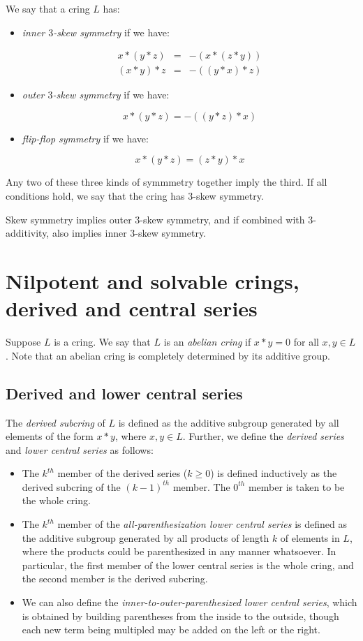 \documentclass[10pt]{amsart}
\begin{document}
We say that a cring $L$ has:

\begin{itemize}
\item {\em inner $3$-skew symmetry} if we have:

  \begin{eqnarray*}
    x * (y * z) & = & -(x * (z * y))\\
    (x * y) * z & = & - ((y * x) * z)
  \end{eqnarray*}
\item {\em outer $3$-skew symmetry} if we have:
  
  $$x * (y * z) = -((y * z) * x)$$
\item {\em flip-flop symmetry} if we have:

  $$x * (y * z) = (z * y) * x$$
\end{itemize}

Any two of these three kinds of symmmetry together imply the third. If
all conditions hold, we say that the cring has {$3$-skew symmetry}.

Skew symmetry implies outer $3$-skew symmetry, and if combined with
$3$-additivity, also implies inner $3$-skew symmetry.

\section{Nilpotent and solvable crings, derived and central series}

Suppose $L$ is a cring. We say that $L$ is an {\em abelian cring} if
$x * y = 0$ for all $x,y \in L$. Note that an abelian cring is
completely determined by its additive group.

\subsection{Derived and lower central series}

The {\em derived subcring} of $L$ is defined as the additive subgroup
generated by all elements of the form $x * y$, where $x,y \in
L$. Further, we define the {\em derived series} and {\em lower central
series} as follows:

\begin{itemize}
\item The $k^{th}$ member of the derived series ($k \ge 0$) is defined
  inductively as the derived subcring of the $(k - 1)^{th}$
  member. The $0^{th}$ member is taken to be the whole cring.
\item The $k^{th}$ member of the {\em all-parenthesization lower
  central series} is defined as the additive subgroup generated by all
  products of length $k$ of elements in $L$, where the products could
  be parenthesized in any manner whatsoever. In particular, the first
  member of the lower central series is the whole cring, and the
  second member is the derived subcring.
\item We can also define the {\em inner-to-outer-parenthesized lower
  central series}, which is obtained by building parentheses from the
  inside to the outside, though each new term being multipled may be
  added on the left or the right.
\end{itemize}
\end{document}

